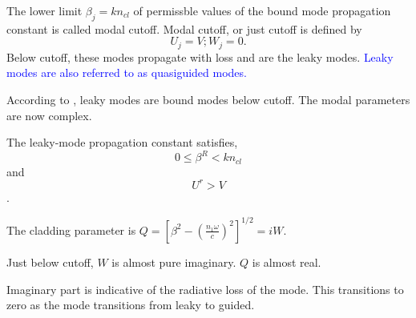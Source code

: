\documentclass[12pt]{article}
\numberwithin{equation}{section}
\newcommand{\blue}[1]{\textcolor{blue}{#1}} %
\begin{document}
The lower limit $\beta_j = k n_{cl}$ of permissble values of the bound mode propagation constant is called 
modal cutoff.  Modal cutoff, or just cutoff is defined by 
\begin{equation}
U_j = V; W_j = 0.
\end{equation}
Below cutoff, these modes propagate with loss and are the leaky modes.  
\blue{Leaky modes are also referred to as quasiguided modes.}



According to \cite{Snyder:83}, 
leaky modes are bound modes below cutoff.  The modal parameters are now complex.  

The leaky-mode propagation constant satisfies, 
\begin{equation}
0 \leq \beta^{R} < k n_{cl}
\end{equation}
and 
\begin{equation}
U^r > V
\end{equation}.

The cladding parameter is $Q = \left [ \beta^2 - \left ( \frac{n_1 \omega}{c} \right )^2   \right ]^{1/2} = i W$.

Just below cutoff, $W$ is almost pure imaginary.  
$Q$ is almost real.  

Imaginary part is indicative of the radiative loss of the mode.  This transitions to zero as the mode transitions from leaky to guided.  








\end{document}
